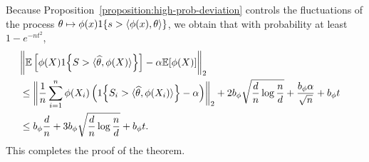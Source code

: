 \documentclass[11pt]{article}
\newcommand{\radphi}{b_{\phi}}
\newcommand{\scorefunc}{s}
\newcommand{\scoreval}{\scorefunc}
\newcommand{\scorerv}{S}
\begin{document}
Because Proposition~\ref{proposition:high-prob-deviation}
controls the fluctuations of the process $\theta
\mapsto \phi(x) \indic{\scoreval > \<\phi(x), \theta\>}$,
we obtain that with probability at least
$1 - e^{-nt^2}$,
\begin{align*}
  \lefteqn{\ltwobigg{\E\left[\phi(X)
        \indic{\scorerv > \<\what{\theta}, \phi(X)\>}\right]
      - \alpha \E[\phi(X)]}} \\
  & \le
  \ltwobigg{\frac{1}{n} \sum_{i = 1}^n
    \phi(X_i) \left(
    \indic{\scorerv_i > \<\what{\theta}, \phi(X_i)\>} - \alpha
    \right)}
  + 2 \radphi \sqrt{\frac{d}{n} \log \frac{n}{d}}
  + \frac{\radphi \alpha}{\sqrt{n}} + \radphi t \\
  & \le \radphi \frac{d}{n} + 3 \radphi \sqrt{\frac{d}{n} \log \frac{n}{d}}
  + \radphi t.
\end{align*}
This completes the proof of the theorem.




\end{document}
